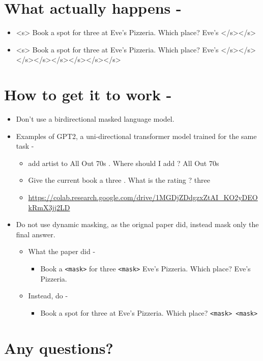 \documentclass[11pt]{article}
\begin{document}
\section{What actually happens -}
\label{sec:org53f04c3}
\begin{itemize}
\item <s> Book a spot for three at Eve's Pizzeria. Which place? Eve's </s></s>
\item <s> Book a spot for three at Eve's Pizzeria. Which place? Eve's </s></s></s></s></s></s></s></s>
\end{itemize}

\section{How to get it to work -}
\label{sec:orgaf19293}

\begin{itemize}
\item Don't use a birdirectional masked language model.
\item Examples of GPT2, a uni-directional transformer model trained for the same
task -
\begin{itemize}
\item add artist to All Out 70s . Where should I add ? All Out 70s
\item Give the current  book a three . What is the rating ? three
\item \url{https://colab.research.google.com/drive/1MGDjZDdgzxZtAI\_KO2yDEOkRmX3jj2LD}
\end{itemize}
\item Do not use dynamic masking, as the orignal paper did, instead mask only the
final answer.
\begin{itemize}
\item What the paper did -
\begin{itemize}
\item Book a \texttt{<mask>} for three \texttt{<mask>} Eve's Pizzeria. Which place? Eve's
Pizzeria.
\end{itemize}
\item Instead, do -
\begin{itemize}
\item Book a spot for three at Eve's Pizzeria. Which place? \texttt{<mask>
     <mask>}
\end{itemize}
\end{itemize}
\end{itemize}

\section{Any questions?}
\label{sec:org2a64843}
\end{document}
